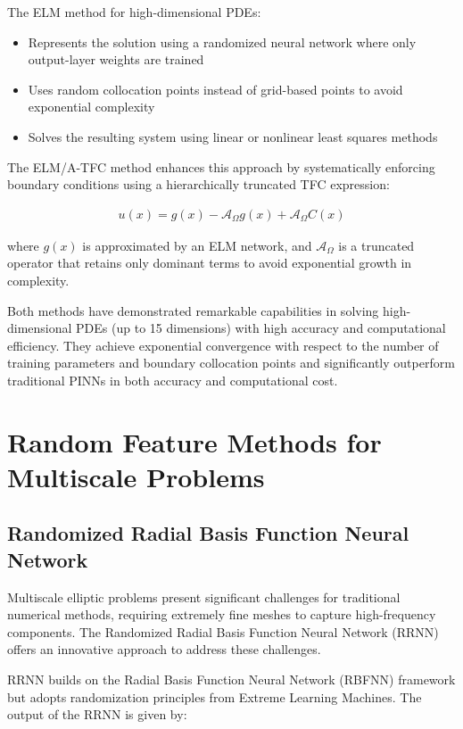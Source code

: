 \documentclass[11pt]{article}
\begin{document}
The ELM method for high-dimensional PDEs:
\begin{itemize}
    \item Represents the solution using a randomized neural network where only output-layer weights are trained
    \item Uses random collocation points instead of grid-based points to avoid exponential complexity
    \item Solves the resulting system using linear or nonlinear least squares methods
\end{itemize}

The ELM/A-TFC method enhances this approach by systematically enforcing boundary conditions using a hierarchically truncated TFC expression:

\begin{align}
    u(x) = g(x) - \mathcal{A}_\Omega g(x) + \mathcal{A}_\Omega C(x)
\end{align}

where $g(x)$ is approximated by an ELM network, and $\mathcal{A}_\Omega$ is a truncated operator that retains only dominant terms to avoid exponential growth in complexity.

Both methods have demonstrated remarkable capabilities in solving high-dimensional PDEs (up to 15 dimensions) with high accuracy and computational efficiency. They achieve exponential convergence with respect to the number of training parameters and boundary collocation points and significantly outperform traditional PINNs in both accuracy and computational cost.

\section{Random Feature Methods for Multiscale Problems}

\subsection{Randomized Radial Basis Function Neural Network}

Multiscale elliptic problems present significant challenges for traditional numerical methods, requiring extremely fine meshes to capture high-frequency components. The Randomized Radial Basis Function Neural Network (RRNN) \citep{Wu2023} offers an innovative approach to address these challenges.

RRNN builds on the Radial Basis Function Neural Network (RBFNN) framework but adopts randomization principles from Extreme Learning Machines. The output of the RRNN is given by:
\end{document}
